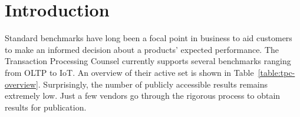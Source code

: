 \documentclass{cidr-2019}
\begin{document}
\maketitle

\section{Introduction}\label{Introduction}


Standard benchmarks have long been a focal point in business to aid
customers to make an informed decision about a products' expected
performance. The Transaction Processing Counsel currently supports
several benchmarks ranging from OLTP to IoT. An overview of their
active set is shown in Table~\ref{table:tpc-overview}. Surprisingly,
the number of publicly accessible results remains extremely low. Just
a few vendors go through the rigorous process to obtain results for
publication.

\end{document}
